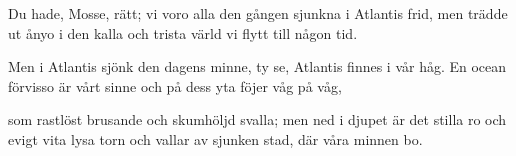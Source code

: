 \beginverse*
Du hade, Mosse, rätt; vi voro alla
den gången sjunkna i Atlantis frid,
men trädde ut ånyo i den kalla
och trista värld vi flytt till någon tid.
\endverse

\newpage
\beginverse*
Men i Atlantis sjönk den dagens minne,
ty se, Atlantis finnes i vår håg.
En ocean förvisso är vårt sinne
och på dess yta föjer våg på våg,
\endverse

\beginverse*
som rastlöst brusande och skumhöljd svalla;
men ned i djupet är det stilla ro
och evigt vita lysa torn och vallar
av sjunken stad, där våra minnen bo.
\endverse
\endsong